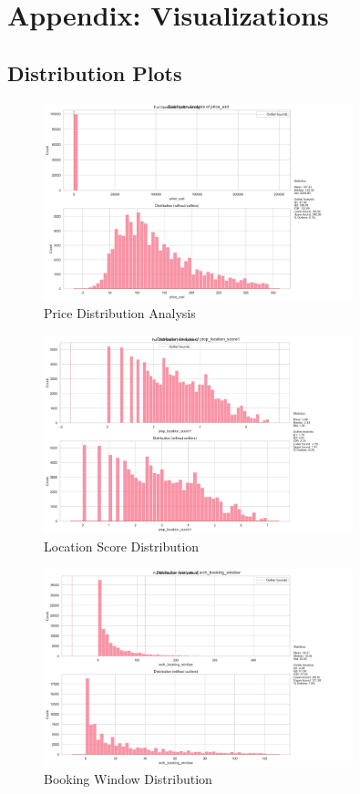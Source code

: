 \documentclass{article}
\begin{document}
\section{Appendix: Visualizations}
\subsection{Distribution Plots}
\begin{figure}[H]
\centering
\includegraphics[width=0.8\textwidth]{../plots/price_usd_enhanced_distribution.png}
\caption{Price Distribution Analysis}
\end{figure}

\begin{figure}[H]
\centering
\includegraphics[width=0.8\textwidth]{../plots/prop_location_score1_enhanced_distribution.png}
\caption{Location Score Distribution}
\end{figure}

\begin{figure}[H]
\centering
\includegraphics[width=0.8\textwidth]{../plots/srch_booking_window_enhanced_distribution.png}
\caption{Booking Window Distribution}
\end{figure}
\end{document}

